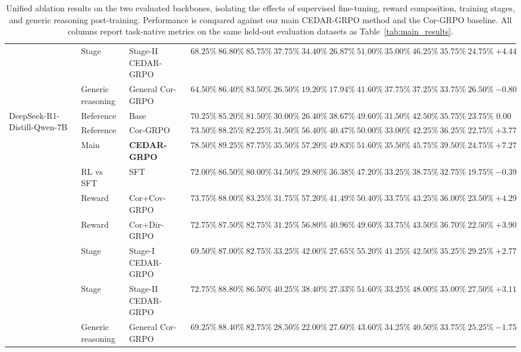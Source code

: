\documentclass[11pt]{article}
\begin{document}
\begin{table}[t]
{\begin{tabular}{lllcccccccccccc}
& Stage & Stage-II CEDAR-GRPO
& $68.25\%$ & $86.80\%$ & $85.75\%$ & $\mathbf{37.75\%}$ & $34.40\%$ & $26.87\%$ & $51.00\%$ & $35.00\%$ & $\mathbf{46.25\%}$ & $35.75\%$ & $24.75\%$ & $+4.44$ \\
& Generic reasoning & General Cor-GRPO
& $64.50\%$ & $86.40\%$ & $83.50\%$ & $26.50\%$ & $19.20\%$ & $17.94\%$ & $41.60\%$ & $37.75\%$ & $37.25\%$ & $33.75\%$ & $26.50\%$ & $-0.80$ \\
\midrule
\multirow{9}{2.7cm}{\raggedright DeepSeek-R1-Distill-Qwen-7B} 
& Reference & Base
& $70.25\%$ & $85.20\%$ & $81.50\%$ & $30.00\%$ & $26.40\%$ & $38.67\%$ & $49.60\%$ & $31.50\%$ & $42.50\%$ & $35.75\%$ & $23.75\%$ & $0.00$ \\
& Reference & Cor-GRPO
& $73.50\%$ & $88.25\%$ & $82.25\%$ & $31.50\%$ & $56.40\%$ & $40.47\%$ & $50.00\%$ & $33.00\%$ & $42.25\%$ & $36.25\%$ & $22.75\%$ & $+3.77$ \\
& Main & \textbf{CEDAR-GRPO}
& $\mathbf{78.50\%}$ & $\mathbf{89.25\%}$ & $\mathbf{87.75\%}$ & $35.50\%$ & $\mathbf{57.20\%}$ & $\mathbf{49.83\%}$ & $51.60\%$ & $35.50\%$ & $45.75\%$ & $\mathbf{39.50\%}$ & $24.75\%$ & $+7.27$ \\
\cmidrule(lr){2-15}
& RL vs SFT & SFT
& $72.00\%$ & $86.50\%$ & $80.00\%$ & $34.50\%$ & $29.80\%$ & $36.38\%$ & $47.20\%$ & $33.25\%$ & $38.75\%$ & $32.75\%$ & $19.75\%$ & $-0.39$ \\
& Reward & Cor+Cov-GRPO
& $73.75\%$ & $88.00\%$ & $83.25\%$ & $31.75\%$ & $\mathbf{57.20\%}$ & $41.49\%$ & $50.40\%$ & $33.75\%$ & $43.25\%$ & $36.00\%$ & $23.50\%$ & $+4.29$ \\
& Reward & Cor+Dir-GRPO
& $72.75\%$ & $87.50\%$ & $82.75\%$ & $31.25\%$ & $56.80\%$ & $40.96\%$ & $49.60\%$ & $33.75\%$ & $43.50\%$ & $36.70\%$ & $22.50\%$ & $+3.90$ \\
& Stage & Stage-I CEDAR-GRPO
& $69.50\%$ & $87.00\%$ & $82.75\%$ & $33.25\%$ & $42.00\%$ & $27.65\%$ & $\mathbf{55.20\%}$ & $\mathbf{41.25\%}$ & $42.50\%$ & $35.25\%$ & $\mathbf{29.25\%}$ & $+2.77$ \\
& Stage & Stage-II CEDAR-GRPO
& $72.75\%$ & $88.80\%$ & $86.50\%$ & $\mathbf{40.25\%}$ & $38.40\%$ & $27.33\%$ & $51.60\%$ & $33.25\%$ & $\mathbf{48.00\%}$ & $35.00\%$ & $27.50\%$ & $+3.11$ \\
& Generic reasoning & General Cor-GRPO
& $69.25\%$ & $88.40\%$ & $82.75\%$ & $28.50\%$ & $22.00\%$ & $27.60\%$ & $43.60\%$ & $34.25\%$ & $40.50\%$ & $33.75\%$ & $25.25\%$ & $-1.75$ \\
\bottomrule
\end{tabular}%
}
\caption{Unified ablation results on the two evaluated backbones, isolating the effects of supervised fine-tuning, reward composition, training stages, and generic reasoning post-training. Performance is compared against our main CEDAR-GRPO method and the Cor-GRPO baseline. All columns report task-native metrics on the same held-out evaluation datasets as Table~\ref{tab:main_results}.}
\label{tab:unified_ablations}
\end{table}
\end{document}
